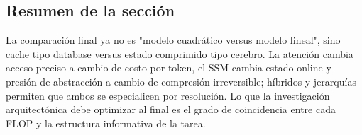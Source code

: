 \subsection{Resumen de la sección}

La comparación final ya no es "modelo cuadrático versus modelo lineal", sino cache tipo database versus estado comprimido tipo cerebro. La atención cambia acceso preciso a cambio de costo por token, el SSM cambia estado online y presión de abstracción a cambio de compresión irreversible; híbridos y jerarquías permiten que ambos se especialicen por resolución. Lo que la investigación arquitectónica debe optimizar al final es el grado de coincidencia entre cada FLOP y la estructura informativa de la tarea.
